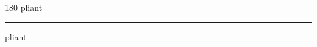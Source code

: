 
\begin{frame}
\begin{center}
\begin{turn}{180}
{\fontsize{2.5cm}{1em}\selectfont pliant}
\end{turn}
\vspace{1em}\par  
\hrule
\vspace{1em}\par  
{\fontsize{2.5cm}{1em}\selectfont pliant}
\end{center}
\end{frame}
